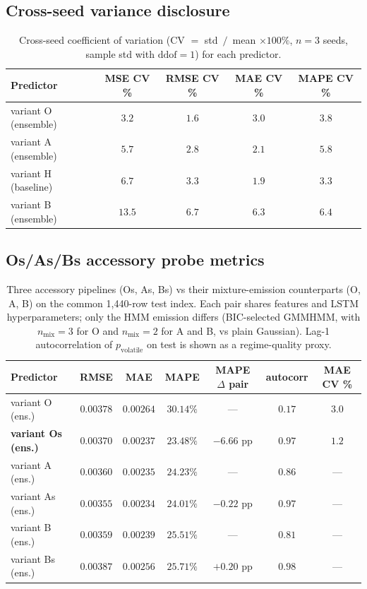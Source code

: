 \documentclass{article}
\begin{document}
\subsection{Cross-seed variance disclosure}
\label{app:cv}

\begin{table}[H]
\centering
\caption{Cross-seed coefficient of variation (CV $=$ std~$/$~mean $\times 100\%$, $n=3$ seeds, sample std with $\mathrm{ddof}{=}1$) for each predictor.}
\label{tab:cv}
\small
\begin{tabular}{@{}lcccc@{}}
\toprule
Predictor & MSE CV \% & RMSE CV \% & MAE CV \% & MAPE CV \% \\
\midrule
variant O (ensemble) & $3.2$  & $1.6$  & $3.0$  & $3.8$  \\
variant A (ensemble) & $5.7$  & $2.8$  & $2.1$  & $5.8$  \\
variant H (baseline) & $6.7$  & $3.3$  & $1.9$  & $3.3$  \\
variant B (ensemble) & $\mathbf{13.5}$ & $\mathbf{6.7}$ & $\mathbf{6.3}$ & $6.4$ \\
\bottomrule
\end{tabular}
\end{table}

\subsection{Os/As/Bs accessory probe metrics}
\label{app:os-probe}

\begin{table}[H]
\centering
\caption{Three accessory pipelines (Os, As, Bs) vs their mixture-emission counterparts (O, A, B) on the common 1{,}440-row test index. Each pair shares features and LSTM hyperparameters; only the HMM emission differs (BIC-selected GMMHMM, with $n_{\mathrm{mix}}=3$ for O and $n_{\mathrm{mix}}=2$ for A and B, vs plain Gaussian). Lag-1 autocorrelation of $p_{\mathrm{volatile}}$ on test is shown as a regime-quality proxy.}
\label{tab:os-probe}
\small
\begin{tabular}{@{}lcccccc@{}}
\toprule
Predictor & RMSE & MAE & MAPE & MAPE $\Delta$ pair & autocorr & MAE CV \% \\
\midrule
variant O  (ens.) & $0.00378$ & $0.00264$ & $30.14\%$ & ---       & $0.17$ & $3.0$ \\
\textbf{variant Os (ens.)} & $0.00370$ & $0.00237$ & $\mathbf{23.48\%}$ & $\mathbf{-6.66}$ pp & $\mathbf{0.97}$ & $\mathbf{1.2}$ \\[2pt]
variant A  (ens.) & $0.00360$ & $0.00235$ & $24.23\%$ & ---       & $0.86$ & --- \\
variant As (ens.) & $0.00355$ & $0.00234$ & $24.01\%$ & $-0.22$ pp & $0.97$ & --- \\[2pt]
variant B  (ens.) & $0.00359$ & $0.00239$ & $25.51\%$ & ---       & $0.81$ & --- \\
variant Bs (ens.) & $0.00387$ & $0.00256$ & $25.71\%$ & $+0.20$ pp & $0.98$ & --- \\
\bottomrule
\end{tabular}
\end{table}
\end{document}
